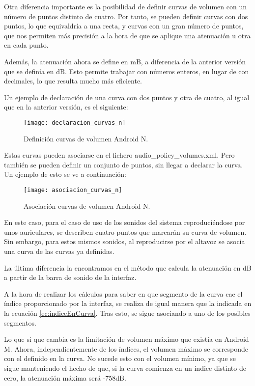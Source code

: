 Otra diferencia importante es la posibilidad de definir curvas de volumen con un número de puntos distinto de cuatro. Por tanto, se pueden definir curvas con dos puntos, lo que equivaldría a una recta, y curvas con un gran número de puntos, que nos permiten más precisión a la hora de que se aplique una atenuación u otra en cada punto.

Además, la atenuación ahora se define en \gls{mB}, a diferencia de la anterior versión que se definía en \gls{dB}. Esto permite trabajar con números enteros, en lugar de con decimales, lo que resulta mucho más eficiente.

Un ejemplo de declaración de una curva con dos puntos y otra de cuatro, al igual que en la anterior versión, es el siguiente:

\begin{figure}[H]
	\centering
	\texttt{[image: declaracion\_curvas\_n]}
	\caption{Definición curvas de volumen Android N.}
	\label{fig:declaracion_curvas_n}
\end{figure}

Estas curvas pueden asociarse en el fichero audio\_policy\_volumes.xml. Pero también se pueden definir un conjunto de puntos, sin llegar a declarar la curva. Un ejemplo de esto se ve a continuación:

\begin{figure}[H]
	\centering
	\texttt{[image: asociacion\_curvas\_n]}
	\caption{Asociación curvas de volumen Android N.}
	\label{fig:asociacion_curvas_n}
\end{figure}

En este caso, para el caso de uso de los sonidos del sistema reproduciéndose por unos auriculares, se describen cuatro puntos que marcarán su curva de volumen. Sin embargo, para estos mismos sonidos, al reproducirse por el altavoz se asocia una curva de las curvas ya definidas.

La última diferencia la encontramos en el método que calcula la atenuación en \gls{dB} a partir de la barra de sonido de la interfaz.

A la hora de realizar los cálculos para saber en que segmento de la curva cae el índice proporcionado por la interfaz, se realiza de igual manera que la indicada en la ecuación \ref{ec:indiceEnCurva}. Tras esto, se sigue asociando a uno de los posibles segmentos.

Lo que si que cambia es la limitación de volumen máximo que existía en Android M. Ahora, independientemente de los índices, el volumen máximo se corresponde con el definido en la curva. No sucede esto con el volumen mínimo, ya que se sigue manteniendo el hecho de que, si la curva comienza en un índice distinto de cero, la atenuación máxima será -758\gls{dB}.

